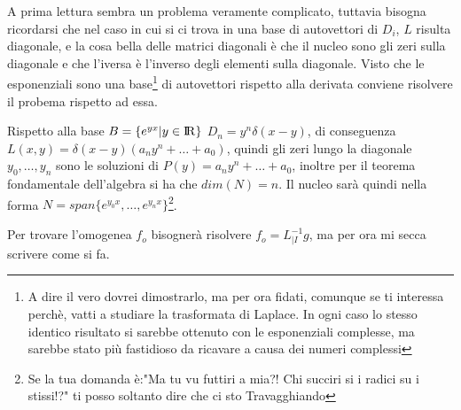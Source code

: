 \documentclass[11pt,a4paper]{article}
\theoremstyle{definition}
\theoremstyle{plain}
\theoremstyle{plain}
\begin{document}
		A prima lettura sembra un problema veramente complicato, tuttavia bisogna ricordarsi che nel caso in cui si ci trova in una base di autovettori di $D_i$, $L$ risulta diagonale, e la cosa bella delle matrici diagonali è che il nucleo sono gli zeri sulla diagonale e che l'iversa è l'inverso degli elementi sulla diagonale.\newline
		Visto che le esponenziali sono una base\footnote{A dire il vero dovrei dimostrarlo, ma per ora fidati, comunque se ti interessa perchè, vatti a studiare la trasformata di Laplace. In ogni caso lo stesso identico risultato si sarebbe ottenuto con le esponenziali complesse, ma sarebbe stato più fastidioso da ricavare a causa dei numeri complessi} di autovettori rispetto alla derivata conviene risolvere il probema rispetto ad essa.\newline

		Rispetto alla base $B=\{e^{yx}|y \in \rm I\!R\}$ $D_n=y^n\delta(x-y)$, di conseguenza $L(x,y)=\delta(x-y)(a_ny^n+\dots+a_0)$, quindi gli zeri lungo la diagonale $y_0,\dots,y_n$ sono le soluzioni di $P(y)=a_ny^n+\dots+a_0$, inoltre per il teorema fondamentale dell'algebra si ha che $dim(N)=n$. Il nucleo sarà quindi nella forma $N=span\{e^{y_0x},\dots,e^{y_nx}\}$\footnote{Se la tua domanda è:"Ma tu vu futtiri a mia?! Chi succiri si i radici su i stissi!?" ti posso soltanto dire che ci sto Travagghiando}.\newline

		Per trovare l'omogenea $f_o$ bisognerà risolvere $f_o=L^{-1}_{|I}g$, ma per ora mi secca scrivere come si fa.
\end{document}
